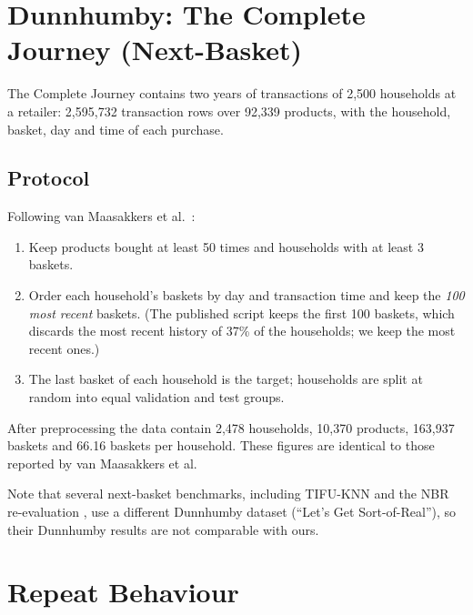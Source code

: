 \documentclass[12pt,a4paper]{report}
\begin{document}
\section{Dunnhumby: The Complete Journey (Next-Basket)}

The Complete Journey contains two years of transactions of 2,500 households at a
retailer: 2,595,732 transaction rows over 92,339 products, with the household,
basket, day and time of each purchase.

\subsection{Protocol}

Following van Maasakkers et al.\ \cite{vanmaasakkers2023}:

\begin{enumerate}
    \item Keep products bought at least 50 times and households with at least 3
          baskets.
    \item Order each household's baskets by day and transaction time and keep the
          \emph{100 most recent} baskets. (The published script keeps the first
          100 baskets, which discards the most recent history of 37\% of the
          households; we keep the most recent ones.)
    \item The last basket of each household is the target; households are split
          at random into equal validation and test groups.
\end{enumerate}

After preprocessing the data contain 2,478 households, 10,370 products, 163,937
baskets and 66.16 baskets per household. These figures are identical to those
reported by van Maasakkers et al.

Note that several next-basket benchmarks, including TIFU-KNN \cite{hu2020} and
the NBR re-evaluation \cite{li2023}, use a different Dunnhumby dataset (``Let's
Get Sort-of-Real''), so their Dunnhumby results are not comparable with ours.

\begin{center}\end{center}

\section{Repeat Behaviour}
\end{document}
